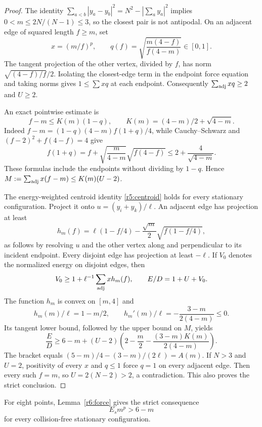 \documentclass[12pt,reqno]{amsart}
\theoremstyle{definition}
\numberwithin{equation}{section}
\begin{document}
\begin{proof}
The identity $\sum_{a<b}|y_a-y_b|^2=N^2-|\sum_a y_a|^2$ implies
$0<m\le2N/(N-1)\le3$, so the closest pair is not antipodal. On an adjacent
edge of squared length $f\ge m$, set
\[
 x=(m/f)^p,\qquad q(f)=\sqrt{\frac{m(4-f)}{f(4-m)}}\in[0,1].
\]
The tangent projection of the other vertex, divided by $f$, has norm
$\sqrt{(4-f)/f}/2$. Isolating the closest-edge term in the endpoint
force equation and taking norms gives $1\le\sum xq$ at each endpoint.
Consequently $\sum_{\rm adj}xq\ge2$ and $U\ge2$.

An exact pointwise estimate is
\[
 f-m\le K(m)(1-q),\qquad K(m)=(4-m)/2+\sqrt{4-m}.
\]
Indeed $f-m=(1-q)(4-m)f(1+q)/4$, while Cauchy--Schwarz and
$(f-2)^2+f(4-f)=4$ give
\[
 f(1+q)=f+\sqrt{\frac m{4-m}}\sqrt{f(4-f)}\le2+\frac4{\sqrt{4-m}}.
\]
These formulas include the endpoints without dividing by $1-q$. Hence
$M:=\sum_{\rm adj}x(f-m)\le K(m)(U-2)$.

The energy-weighted centroid identity \eqref{r5:centroid} holds for every
stationary configuration. Project it onto $u=(y_i+y_k)/\ell$. An adjacent
edge has projection at least
\[
 h_m(f)=\ell(1-f/4)-\frac{\sqrt m}{2}\sqrt{f(1-f/4)},
\]
as follows by resolving $u$ and the other vertex along and perpendicular
to its incident endpoint. Every disjoint edge has projection at least
$-\ell$. If $V_0$ denotes the normalized energy on disjoint edges, then
\[
 V_0\ge1+\ell^{-1}\sum_{\rm adj}x h_m(f),\qquad E/D=1+U+V_0.
\]
The function $h_m$ is convex on $[m,4]$ and
\[
 h_m(m)/\ell=1-m/2,\qquad
 h_m'(m)/\ell=-\frac{3-m}{2(4-m)}\le0.
\]
Its tangent lower bound, followed by the upper bound on $M$, yields
\[
 \frac ED\ge6-m+(U-2)\left(2-\frac m2-
                  \frac{(3-m)K(m)}{2(4-m)}\right).
\]
The bracket equals $(5-m)/4-(3-m)/(2\ell)=A(m)$.
If $N>3$ and $U=2$, positivity of every $x$ and $q\le1$ force $q=1$ on
every adjacent edge. Then every such $f=m$, so $U=2(N-2)>2$, a
contradiction. This also proves the strict conclusion.
\end{proof}

For eight points, Lemma~\ref{r6:force} gives the strict consequence
\begin{equation}\label{tail:force}
 E_sm^p>6-m
\end{equation}
for every collision-free stationary configuration.
\end{document}
